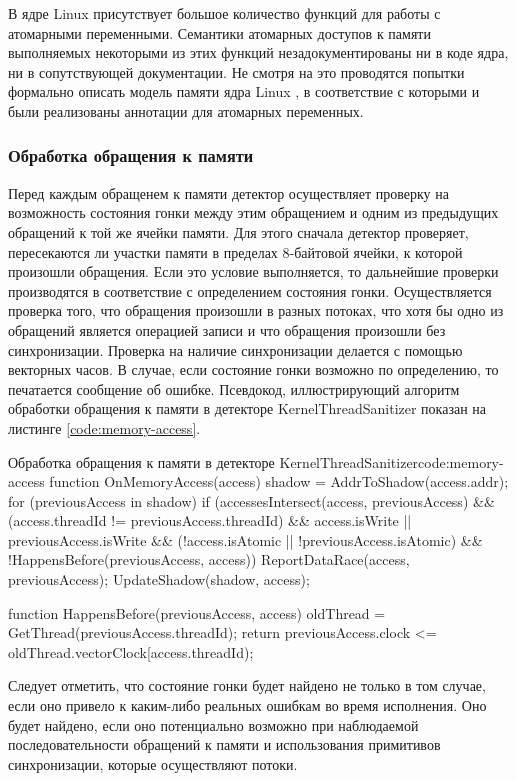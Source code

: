 В ядре Linux присутствует большое количество функций для работы с атомарными переменными.
Семантики атомарных доступов к памяти выполняемых некоторыми из этих функций незадокументированы ни в коде ядра, ни в сопутствующей документации.
Не смотря на это проводятся попытки формально описать модель памяти ядра Linux \cite{memory-model}, в соответствие с которыми и были реализованы аннотации для атомарных переменных.


\subsubsection{Обработка обращения к памяти}

Перед каждым обращенем к памяти детектор осуществляет проверку на возможность состояния гонки между этим обращением и одним из предыдущих обращений к той же ячейки памяти.
Для этого сначала детектор проверяет, пересекаются ли участки памяти в пределах 8-байтовой ячейки, к которой произошли обращения.
Если это условие выполняется, то дальнейшие проверки производятся в соответствие с определением состояния гонки.
Осуществляется проверка того, что обращения произошли в разных потоках, что хотя бы одно из обращений является операцией записи и что обращения произошли без синхронизации.
Проверка на наличие синхронизации делается с помощью векторных часов.
В случае, если состояние гонки возможно по определению, то печатается сообщение об ошибке.
Псевдокод, иллюстрирующий алгоритм обработки обращения к памяти в детекторе KernelThreadSanitizer показан на листинге \ref{code:memory-access}.

\begin{listing}{Обработка обращения к памяти в детекторе KernelThreadSanitizer}{code:memory-access}
function OnMemoryAccess(access) {
  shadow = AddrToShadow(access.addr);
  for (previousAccess in shadow) {
    if (accessesIntersect(access, previousAccess) &&
        (access.threadId != previousAccess.threadId) &&
        access.isWrite || previousAccess.isWrite &&
        (!access.isAtomic || !previousAccess.isAtomic) &&
        !HappensBefore(previousAccess, access)) {
      ReportDataRace(access, previousAccess);
    }
  }
  UpdateShadow(shadow, access);
}

function HappensBefore(previousAccess, access) {
  oldThread = GetThread(previousAccess.threadId);
  return previousAccess.clock <= oldThread.vectorClock[access.threadId);
}
\end{listing}

Следует отметить, что состояние гонки будет найдено не только в том случае, если оно привело к каким-либо реальных ошибкам во время исполнения.
Оно будет найдено, если оно потенциально возможно при наблюдаемой последовательности обращений к памяти и использования примитивов синхронизации, которые осуществляют потоки.

